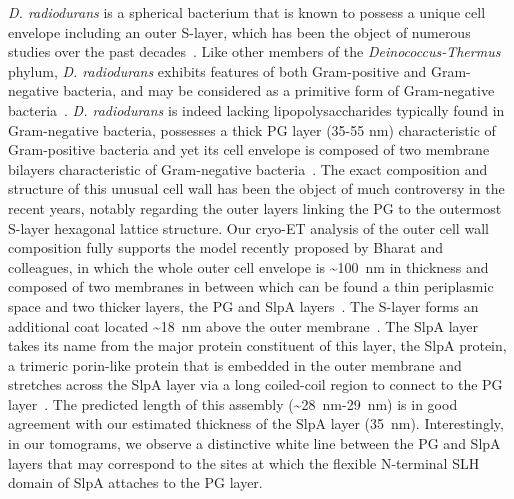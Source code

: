 \textit{D. radiodurans} is a spherical bacterium that is known to possess a unique cell envelope including an outer S-layer, which has been the object of numerous studies over the past decades~\cite{vonkugelgenMultidomainConnectorLinks2022,workMorphologyChemistryCell1968,rothfussInvolvementSlayerProteins2006,vonkugelgenInterdigitatedImmunoglobulinArrays2023,farciSDBCActiveQuenching2023,farciStructuredOrganizationDeinococcus2022,farciCryoEMStructureSlayer2022,farciStructuralAnalysisArchitecture2021,baumeisterThreedimensionalStructureRegular1986,baumeisterStructureCellEnvelope1981}.
Like other members of the \textit{Deinococcus-Thermus} phylum, \textit{D. radiodurans} exhibits features of both Gram-positive and Gram-negative bacteria, and may be considered as a primitive form of Gram-negative bacteria~\cite{ericksonHowBacterialCell2017}.
\textit{D. radiodurans} is indeed lacking lipopolysaccharides typically found in Gram-negative bacteria, possesses a thick PG layer (35-55 nm) characteristic of Gram-positive bacteria and yet its cell envelope is composed of two membrane bilayers characteristic of Gram-negative bacteria~\cite{guptaOriginDidermGramnegative2011}.
The exact composition and structure of this unusual cell wall has been the object of much controversy in the recent years, notably regarding the outer layers linking the PG to the outermost S-layer hexagonal lattice structure.
Our cryo-ET analysis of the outer cell wall composition fully supports the model recently proposed by Bharat and colleagues, in which the whole outer cell envelope is \sim\qty{100}{nm} in thickness and composed of two membranes in between which can be found a thin periplasmic space and two thicker layers, the PG and SlpA layers~\cite{vonkugelgenMultidomainConnectorLinks2022}.
The S-layer forms an additional coat located \sim\qty{18}{nm} above the outer membrane~\cite{vonkugelgenInterdigitatedImmunoglobulinArrays2023}.
The SlpA layer takes its name from the major protein constituent of this layer, the SlpA protein, a trimeric porin-like protein that is embedded in the outer membrane and stretches across the SlpA layer via a long coiled-coil region to connect to the PG layer~\cite{vonkugelgenMultidomainConnectorLinks2022}.
The predicted length of this assembly (\sim\qty{28}{nm}-\qty{29}{nm}) is in good agreement with our estimated thickness of the SlpA layer (\qty{35}{nm}).
Interestingly, in our tomograms, we observe a distinctive white line between the PG and SlpA layers that may correspond to the sites at which the flexible N-terminal SLH domain of SlpA attaches to the PG layer.


